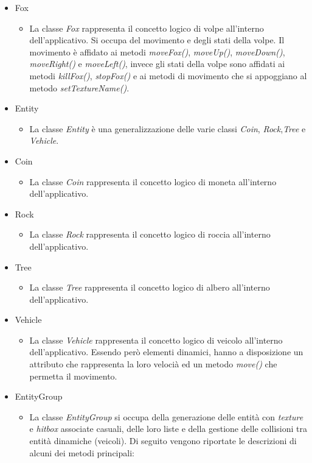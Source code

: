 \documentclass[12pt,a4paper]{report}
\begin{document}
\begin{itemize}
	\item Fox
	\begin{itemize}
		\item La classe \emph{Fox} rappresenta il concetto logico di volpe all'interno dell'applicativo. Si occupa del movimento e degli stati della volpe. Il movimento è affidato ai metodi \emph{moveFox()}, \emph{moveUp()}, \emph{moveDown()}, \emph{moveRight()} e \emph{moveLeft()}, invece gli stati della volpe sono affidati ai metodi \emph{killFox()}, \emph{stopFox()} e ai metodi di movimento che si appoggiano al metodo \emph{setTextureName()}.
	\end{itemize}
	\item Entity
	\begin{itemize}
		\item La classe \emph{Entity} è una generalizzazione delle varie classi \emph{Coin}, \emph{Rock},\emph{Tree} e \emph{Vehicle}.
	\end{itemize}
	\item Coin
	\begin{itemize}
		\item La classe \emph{Coin} rappresenta il concetto logico di moneta all'interno dell'applicativo.
	\end{itemize}
	\item Rock
	\begin{itemize}
		\item La classe \emph{Rock} rappresenta il concetto logico di roccia all'interno dell'applicativo.
	\end{itemize}
	\item Tree
	\begin{itemize}
		\item La classe \emph{Tree} rappresenta il concetto logico di albero all'interno dell'applicativo.
	\end{itemize}
	\item Vehicle
	\begin{itemize}
		\item La classe \emph{Vehicle} rappresenta il concetto logico di veicolo all'interno dell'applicativo. Essendo però elementi dinamici, hanno a disposizione un attributo che rappresenta la loro velocià ed un metodo \emph{move()} che permetta il movimento.
	\end{itemize}
	\item EntityGroup
	\begin{itemize}
		\item La classe \emph{EntityGroup} si occupa della generazione delle entità con \emph{texture} e \emph{hitbox} associate casuali, delle loro liste e della gestione delle collisioni tra entità dinamiche (veicoli). Di seguito vengono riportate le descrizioni di alcuni dei metodi principali:

\end{itemize}
\end{itemize}
\end{document}
